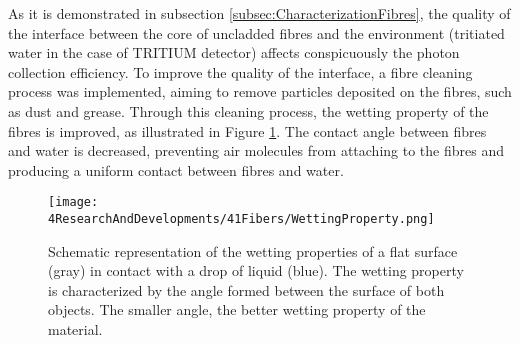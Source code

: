 
As it is demonstrated in subsection \ref{subsec:CharacterizationFibres}, the quality of the interface between the core of uncladded fibres and the environment (tritiated water in the case of TRITIUM detector) affects conspicuously the photon collection efficiency. To improve the quality of the interface, a fibre cleaning process was implemented, aiming to remove particles deposited on the fibres, such as dust and grease.  Through this cleaning process, the wetting property of the fibres is improved, as illustrated in Figure \ref{fig:WettingProperty}. The contact angle between fibres and water is decreased, preventing air molecules from attaching to the fibres and producing a uniform contact between fibres and water.
\begin{figure}[h]
\centering
\texttt{[image: 4ResearchAndDevelopments/41Fibers/WettingProperty.png]}
\caption{Schematic representation of the wetting properties of a flat surface (gray) in contact with a drop of liquid (blue). The wetting property is characterized by the angle formed between the surface of both objects. The smaller angle, the better wetting property of the material. \cite{WettingProperty}\label{fig:WettingProperty}}
\end{figure}
